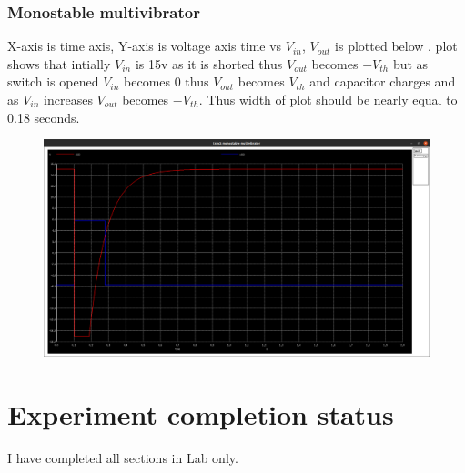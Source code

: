 \documentclass[12pt]{article}
\begin{document}
\subsubsection{Monostable multivibrator}
X-axis is time axis, Y-axis is voltage axis time vs \(V_{in}\), \(V_{out}\) is plotted below . plot shows that intially \(V_{in}\) is 15v as it is shorted thus \(V_{out}\) becomes \(-V_{th}\)  but as switch is opened \(V_{in}\) becomes 0 thus \(V_{out}\) becomes \(V_{th}\)  and capacitor charges and as \(V_{in}\) increases \(V_{out}\) becomes \(-V_{th}\). Thus width of plot should be nearly equal to 0.18 seconds.
\begin{figure}[h!]
\centering
\includegraphics[scale = 0.2]{q3.png}
\end{figure}
\newpage

\section{Experiment completion status}
I have completed all sections in Lab only.
\end{document}

